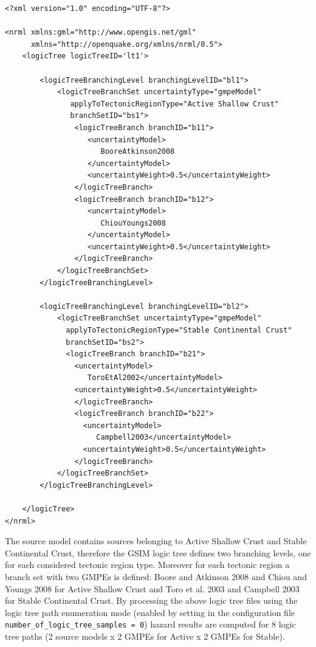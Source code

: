 \begin{Verbatim}[frame=single, commandchars=\\\{\}, fontsize=\normalsize]
<?xml version="1.0" encoding="UTF-8"?>

<nrml xmlns:gml="http://www.opengis.net/gml"
      xmlns="http://openquake.org/xmlns/nrml/0.5">
    <logicTree logicTreeID='lt1'>

        <logicTreeBranchingLevel branchingLevelID="bl1">
            <logicTreeBranchSet uncertaintyType="gmpeModel"
               applyToTectonicRegionType="Active Shallow Crust"
               branchSetID="bs1">
                <logicTreeBranch branchID="b11">
                   <uncertaintyModel>
                      BooreAtkinson2008
                   </uncertaintyModel>
                   <uncertaintyWeight>0.5</uncertaintyWeight>
                </logicTreeBranch>
                <logicTreeBranch branchID="b12">
                   <uncertaintyModel>
                      ChiouYoungs2008
                   </uncertaintyModel>
                   <uncertaintyWeight>0.5</uncertaintyWeight>
                </logicTreeBranch>
            </logicTreeBranchSet>
        </logicTreeBranchingLevel>

        <logicTreeBranchingLevel branchingLevelID="bl2">
            <logicTreeBranchSet uncertaintyType="gmpeModel"
              applyToTectonicRegionType="Stable Continental Crust"
              branchSetID="bs2">
              <logicTreeBranch branchID="b21">
                <uncertaintyModel>
                   ToroEtAl2002</uncertaintyModel>
                <uncertaintyWeight>0.5</uncertaintyWeight>
                </logicTreeBranch>
                <logicTreeBranch branchID="b22">
                  <uncertaintyModel>
                     Campbell2003</uncertaintyModel>
                  <uncertaintyWeight>0.5</uncertaintyWeight>
                </logicTreeBranch>
            </logicTreeBranchSet>
        </logicTreeBranchingLevel>

    </logicTree>
</nrml>
\end{Verbatim}

The source model contains sources belonging to Active Shallow Crust and
Stable Continental Crust, therefore the GSIM logic tree defines two branching
levels, one for each considered tectonic region type. Moreover for each
tectonic region a branch set with two GMPEs is defined: Boore and Atkinson
2008 and Chiou and Youngs 2008 for Active Shallow Crust and Toro et al. 2003
and Campbell 2003 for Stable Continental Crust. By processing the above logic
tree files using the logic tree path enumeration mode (enabled by setting in
the configuration file \texttt{number\_\-of\_\-logic\_\-tree\_\-samples = 0})
hazard results are computed for 8 logic tree paths (2 source models x 2 GMPEs
for Active x 2 GMPEs for Stable).

